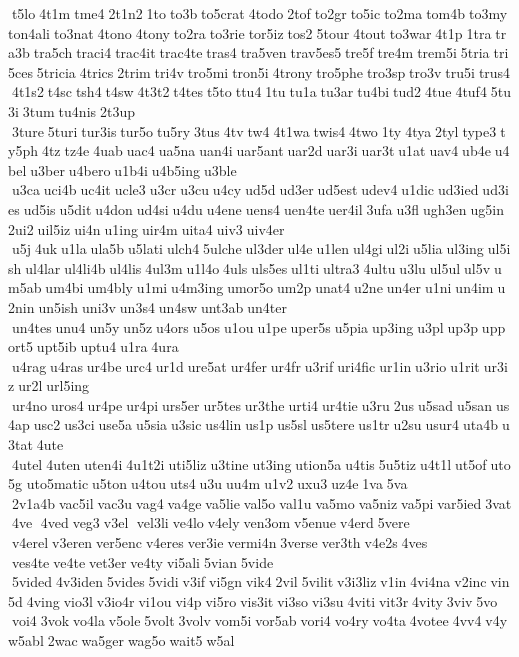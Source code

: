  t5lo 4t1m tme4 2t1n2 1to to3b to5crat 4todo 2tof to2gr to5ic to2ma tom4b to3my ton4ali to3nat 4tono 4tony to2ra to3rie tor5iz tos2 5tour 4tout to3war 4t1p 1tra tra3b tra5ch traci4 trac4it trac4te tras4 tra5ven trav5es5 tre5f tre4m trem5i 5tria tri5ces 5tricia 4trics 2trim tri4v tro5mi tron5i 4trony tro5phe tro3sp tro3v tru5i trus4 4t1s2 t4sc tsh4 t4sw 4t3t2 t4tes t5to ttu4 1tu tu1a tu3ar tu4bi tud2 4tue 4tuf4 5tu3i 3tum tu4nis 2t3up  3ture 5turi tur3is tur5o tu5ry 3tus 4tv tw4 4t1wa twis4 4two 1ty 4tya 2tyl type3 ty5ph 4tz tz4e 4uab uac4 ua5na uan4i uar5ant uar2d uar3i uar3t u1at uav4 ub4e u4bel u3ber u4bero u1b4i u4b5ing u3ble  u3ca uci4b uc4it ucle3 u3cr u3cu u4cy ud5d ud3er ud5est udev4 u1dic ud3ied ud3ies ud5is u5dit u4don ud4si u4du u4ene uens4 uen4te uer4il 3ufa u3fl ugh3en ug5in 2ui2 uil5iz ui4n u1ing uir4m uita4 uiv3 uiv4er  u5j 4uk u1la ula5b u5lati ulch4 5ulche ul3der ul4e u1len ul4gi ul2i u5lia ul3ing ul5ish ul4lar ul4li4b ul4lis 4ul3m u1l4o 4uls uls5es ul1ti ultra3 4ultu u3lu ul5ul ul5v um5ab um4bi um4bly u1mi u4m3ing umor5o um2p unat4 u2ne un4er u1ni un4im u2nin un5ish uni3v un3s4 un4sw unt3ab un4ter  un4tes unu4 un5y un5z u4ors u5os u1ou u1pe uper5s u5pia up3ing u3pl up3p upport5 upt5ib uptu4 u1ra 4ura  u4rag u4ras ur4be urc4 ur1d ure5at ur4fer ur4fr u3rif uri4fic ur1in u3rio u1rit ur3iz ur2l url5ing  ur4no uros4 ur4pe ur4pi urs5er ur5tes ur3the urti4 ur4tie u3ru 2us u5sad u5san us4ap usc2 us3ci use5a u5sia u3sic us4lin us1p us5sl us5tere us1tr u2su usur4 uta4b u3tat 4ute  4utel 4uten uten4i 4u1t2i uti5liz u3tine ut3ing ution5a u4tis 5u5tiz u4t1l ut5of uto5g 	uto5matic u5ton u4tou uts4 u3u uu4m u1v2 uxu3 uz4e 1va 5va  2v1a4b vac5il vac3u vag4 va4ge va5lie val5o val1u va5mo va5niz va5pi var5ied 3vat 4ve  4ved veg3 v3el  vel3li ve4lo v4ely ven3om v5enue v4erd 5vere  v4erel v3eren ver5enc v4eres ver3ie vermi4n 3verse ver3th v4e2s 4ves  ves4te ve4te vet3er ve4ty vi5ali 5vian 5vide  5vided 4v3iden 5vides 5vidi v3if vi5gn vik4 2vil 5vilit v3i3liz v1in 4vi4na v2inc vin5d 4ving vio3l v3io4r vi1ou vi4p vi5ro vis3it vi3so vi3su 4viti vit3r 4vity 3viv 5vo  voi4 3vok vo4la v5ole 5volt 3volv vom5i vor5ab vori4 vo4ry vo4ta 4votee 4vv4 v4y w5abl 2wac wa5ger wag5o wait5 w5al 
